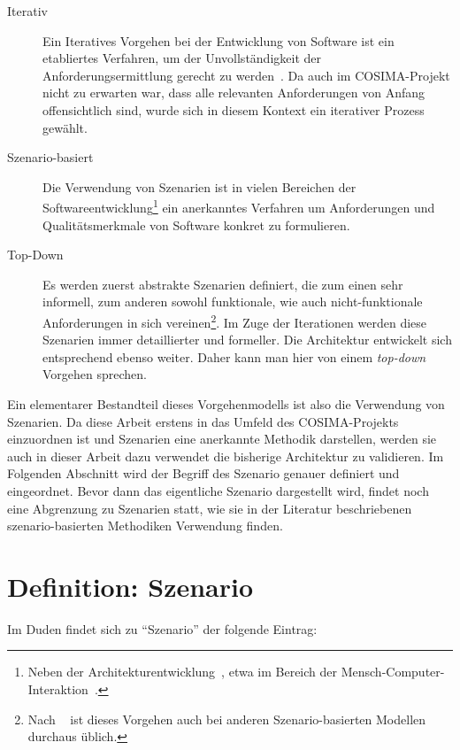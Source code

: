   \begin{description}
    \item[Iterativ] Ein Iteratives Vorgehen bei der Entwicklung von Software ist ein etabliertes Verfahren, um der Unvollständigkeit der Anforderungsermittlung gerecht zu werden~\citep{brooks1987nsb,basili2005iea,boehm1986sm,kruchten2003rup}. Da auch im COSIMA-Projekt nicht zu erwarten war, dass alle relevanten Anforderungen von Anfang offensichtlich sind, wurde sich in diesem Kontext ein iterativer Prozess gewählt.
    \item[Szenario-basiert] Die Verwendung von Szenarien ist in vielen Bereichen der Softwareentwicklung\footnote{Neben der Architekturentwicklung~\citep{software_architecture_in_practice,scenario_based_software_architecture_evaluation_methods}, etwa im Bereich der Mensch-Computer-Interaktion~\cite{five_reasons_for_scenario_based_design}.} ein anerkanntes Verfahren um Anforderungen und Qualitätsmerkmale von Software konkret zu formulieren.
    \item[Top-Down] Es werden zuerst abstrakte Szenarien definiert, die zum einen sehr informell, zum anderen sowohl funktionale, wie auch nicht-funktionale Anforderungen in sich vereinen\footnote{Nach ~\citep[S. 42f]{weidenhaupt1998ssd} ist dieses Vorgehen auch bei anderen Szenario-basierten Modellen durchaus üblich.}. Im Zuge der Iterationen werden diese Szenarien immer detaillierter und formeller. Die Architektur entwickelt sich entsprechend ebenso weiter. Daher kann man hier von einem \emph{top-down} Vorgehen sprechen.
  \end{description}
  
  Ein elementarer Bestandteil dieses Vorgehenmodells ist also die Verwendung von Szenarien. Da diese Arbeit erstens in das Umfeld des COSIMA-Projekts einzuordnen ist und Szenarien eine anerkannte Methodik darstellen, werden sie auch in dieser Arbeit dazu verwendet die bisherige Architektur zu validieren. Im Folgenden Abschnitt wird der Begriff des Szenario genauer definiert und eingeordnet. Bevor dann das eigentliche Szenario dargestellt wird, findet noch eine Abgrenzung zu Szenarien statt, wie sie in der Literatur beschriebenen szenario-basierten Methodiken Verwendung finden.
  
\section{Definition: Szenario} %
\label{sec:definition_szenario}

  Im Duden findet sich zu "`Szenario"' der folgende Eintrag:
  
